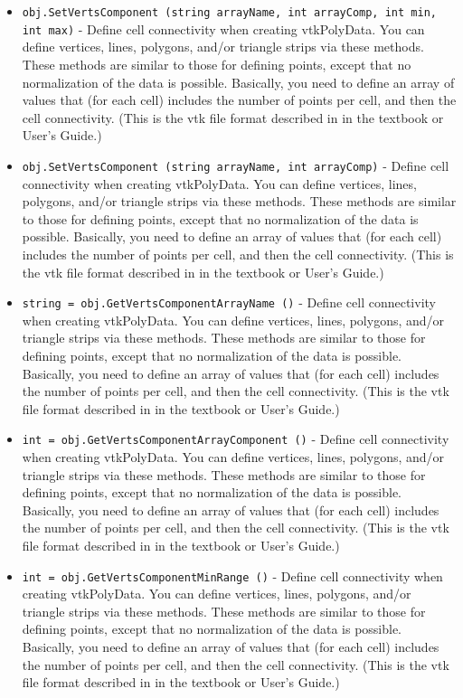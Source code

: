 \begin{itemize}
\item  \verb|obj.SetVertsComponent (string arrayName, int arrayComp, int min, int max)| -  Define cell connectivity when creating vtkPolyData. You can define
 vertices, lines, polygons, and/or triangle strips via these methods.
 These methods are similar to those for defining points, except
 that no normalization of the data is possible. Basically, you need to
 define an array of values that (for each cell) includes the number of 
 points per cell, and then the cell connectivity. (This is the vtk file 
 format described in in the textbook or User's Guide.)

\item  \verb|obj.SetVertsComponent (string arrayName, int arrayComp)| -  Define cell connectivity when creating vtkPolyData. You can define
 vertices, lines, polygons, and/or triangle strips via these methods.
 These methods are similar to those for defining points, except
 that no normalization of the data is possible. Basically, you need to
 define an array of values that (for each cell) includes the number of 
 points per cell, and then the cell connectivity. (This is the vtk file 
 format described in in the textbook or User's Guide.)

\item  \verb|string = obj.GetVertsComponentArrayName ()| -  Define cell connectivity when creating vtkPolyData. You can define
 vertices, lines, polygons, and/or triangle strips via these methods.
 These methods are similar to those for defining points, except
 that no normalization of the data is possible. Basically, you need to
 define an array of values that (for each cell) includes the number of 
 points per cell, and then the cell connectivity. (This is the vtk file 
 format described in in the textbook or User's Guide.)

\item  \verb|int = obj.GetVertsComponentArrayComponent ()| -  Define cell connectivity when creating vtkPolyData. You can define
 vertices, lines, polygons, and/or triangle strips via these methods.
 These methods are similar to those for defining points, except
 that no normalization of the data is possible. Basically, you need to
 define an array of values that (for each cell) includes the number of 
 points per cell, and then the cell connectivity. (This is the vtk file 
 format described in in the textbook or User's Guide.)

\item  \verb|int = obj.GetVertsComponentMinRange ()| -  Define cell connectivity when creating vtkPolyData. You can define
 vertices, lines, polygons, and/or triangle strips via these methods.
 These methods are similar to those for defining points, except
 that no normalization of the data is possible. Basically, you need to
 define an array of values that (for each cell) includes the number of 
 points per cell, and then the cell connectivity. (This is the vtk file 
 format described in in the textbook or User's Guide.)


\end{itemize}
